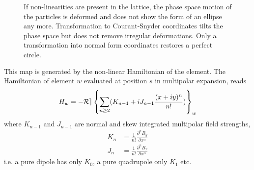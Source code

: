 \begin{figure}[ht]
    \centering
    
    
    
    \caption{
      If non-linearities are present in the lattice, the phase space motion of the particles is
      deformed and does not show the form of an ellipse any more. 
      Transformation to Courant-Snyder
      coordinates tilts the phase space but does not remove irregular deformations.
      Only a transformation into normal form coordinates restores a perfect circle.
    }
    \label{fig_phase_space_ellipse_nl}
\end{figure}

This map is generated by the non-linear Hamiltonian of the element.
The Hamiltonian of element $w$ evaluated at position $s$ in multipolar expansion,
reads
\begin{equation}
  H_w =
  -\mathcal{Re} \left\{ \sum\limits_{n\ge 2} (K_{n-1} + i J_{n-1}\frac{(x+iy)^n}{n!}) \right\}_w
  \label{eq_gen_hamil}
\end{equation}
%
where $K_{n-1}$ and $J_{n-1}$ are normal and skew integrated multipolar field strengths,
%
\begin{align}
  K_n &= \frac{1}{n!}\frac{\partial^n B_y}{\partial x^{n}}\\
  J_n &= \frac{1}{n!}\frac{\partial^n B_x}{\partial x^{n}}
\end{align}
%
i.e. a pure dipole has only $K_0$, a pure quadrupole only $K_1$ etc.

